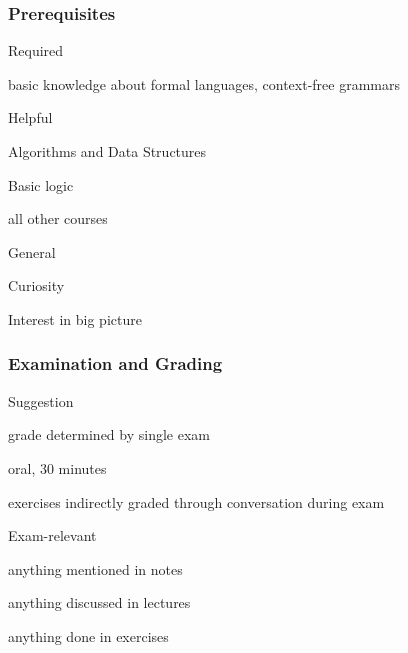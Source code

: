 \begin{frame}\frametitle{Prerequisites}
\begin{blockitems}{Required}
\item basic knowledge about formal languages, context-free grammars
\end{blockitems}

\begin{blockitems}{Helpful}
\item Algorithms and Data Structures
\item Basic logic
\item all other courses
\end{blockitems}

\begin{blockitems}{General}
\item Curiosity 
\item Interest in big picture 
\end{blockitems}
\end{frame}

\begin{frame}\frametitle{Examination and Grading}
\begin{blockitems}{Suggestion}
\item grade determined by single exam
\item oral, 30 minutes
\item exercises indirectly graded through conversation during exam
\end{blockitems}

\begin{blockitems}{Exam-relevant}
\item anything mentioned in notes
\item anything discussed in lectures
\item anything done in exercises
\end{blockitems}
\end{frame}


